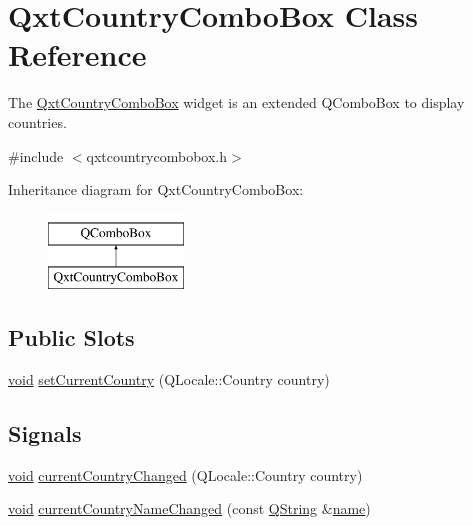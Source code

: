 \hypertarget{class_qxt_country_combo_box}{\section{Qxt\-Country\-Combo\-Box Class Reference}
\label{class_qxt_country_combo_box}
}


The \hyperlink{class_qxt_country_combo_box}{Qxt\-Country\-Combo\-Box} widget is an extended Q\-Combo\-Box to display countries.  




{\ttfamily \#include $<$qxtcountrycombobox.\-h$>$}

Inheritance diagram for Qxt\-Country\-Combo\-Box\-:\begin{figure}[H]
\begin{center}
\leavevmode
\includegraphics[height=2.000000cm]{class_qxt_country_combo_box}
\end{center}
\end{figure}
\subsection*{Public Slots}
\begin{DoxyCompactItemize}
\item 
\hyperlink{group___u_a_v_objects_plugin_ga444cf2ff3f0ecbe028adce838d373f5c}{void} \hyperlink{class_qxt_country_combo_box_ae20207f6fef945ed75fd66581b4209c7}{set\-Current\-Country} (Q\-Locale\-::\-Country country)
\end{DoxyCompactItemize}
\subsection*{Signals}
\begin{DoxyCompactItemize}
\item 
\hyperlink{group___u_a_v_objects_plugin_ga444cf2ff3f0ecbe028adce838d373f5c}{void} \hyperlink{class_qxt_country_combo_box_af58f6e1c956ebff0519cc12b657b3459}{current\-Country\-Changed} (Q\-Locale\-::\-Country country)
\item 
\hyperlink{group___u_a_v_objects_plugin_ga444cf2ff3f0ecbe028adce838d373f5c}{void} \hyperlink{class_qxt_country_combo_box_a1857a7cbf7d0ce1aabc582a03c40cad3}{current\-Country\-Name\-Changed} (const \hyperlink{group___u_a_v_objects_plugin_gab9d252f49c333c94a72f97ce3105a32d}{Q\-String} \&\hyperlink{glext_8h_ad977737dfc9a274a62741b9500c49a32}{name})
\end{DoxyCompactItemize}
